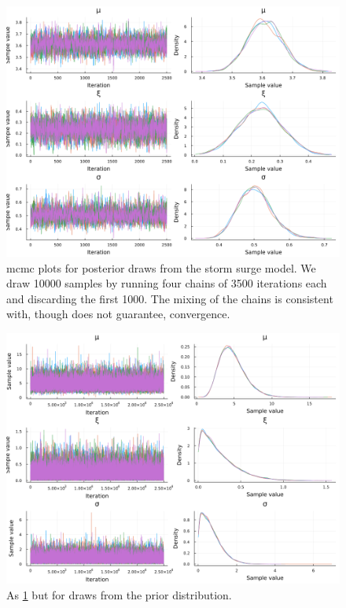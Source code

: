 \documentclass[11pt]{article}
\begin{document}
\begin{figure}
    \centering
    \includegraphics[width=\textwidth]{surge-posterior-chains}
    \caption{
        \Gls{mcmc} plots for posterior draws from the storm surge model.
        We draw \num{10000} samples by running four chains of \num{3500} iterations each and discarding the first \num{1000}.
        The mixing of the chains is consistent with, though does not guarantee, convergence.
    }\label{fig:surge-posterior-chains}
\end{figure}

\begin{figure}
    \centering
    \includegraphics[width=\textwidth]{surge-prior-chains}
    \caption{
        As \cref{fig:surge-posterior-chains} but for draws from the prior distribution.
    }\label{fig:surge-prior-chains}
\end{figure}
\end{document}

